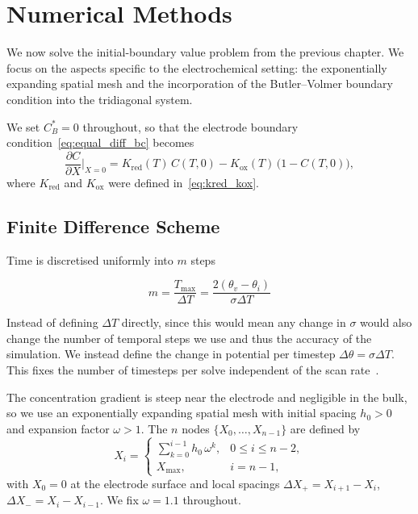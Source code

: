 \chapter{Numerical Methods}\label{ch:numerical-methods}

We now solve the initial-boundary value problem from the previous
chapter. We focus on the aspects specific to the electrochemical
setting: the exponentially expanding spatial mesh and the
incorporation of the Butler--Volmer boundary condition into the
tridiagonal system.

We set $C_B^* = 0$ throughout, so that the electrode boundary
condition~\cref{eq:equal_diff_bc} becomes
\begin{equation}
  \frac{\partial C}{\partial X}\bigg|_{X=0} =
  K_{\mathrm{red}}(T)\, C(T,0)
  - K_{\mathrm{ox}}(T)\, \big(1 - C(T,0)\big),
  \label{eq:num_bc}
\end{equation}
where $K_{\mathrm{red}}$ and $K_{\mathrm{ox}}$ were defined
in~\cref{eq:kred_kox}.

\section{Finite Difference Scheme}\label{sec:fd-scheme}

Time is discretised uniformly into $m$ steps

\begin{equation}
  m = \frac{T_{\mathrm{max}}}{\Delta T} = \frac{2(\theta_v -
  \theta_i)}{\sigma \Delta T}
  \label{eq:temporal_discritisation}
\end{equation}

Instead of defining $\Delta T$ directly, since this would mean any
change in $\sigma$ would also change the number of
temporal steps we use and thus the accuracy of the simulation. We instead
define the change in
potential per timestep $\Delta \theta = \sigma \Delta T$. This fixes
the number of timesteps per solve independent of the scan
rate~\cite{compton2014understanding}.

The concentration gradient is steep near the electrode and negligible in
the bulk, so we use an exponentially expanding spatial mesh with initial
spacing $h_0 > 0$ and expansion factor $\omega > 1$. The $n$ nodes
$\{X_0, \ldots, X_{n-1}\}$ are defined by
\begin{equation}
  X_i =
  \begin{cases}
    \displaystyle \sum_{k=0}^{i-1} h_0\,\omega^k, & 0 \leq i \leq n-2, \\[6pt]
    X_{\mathrm{max}},                               & i = n-1,
  \end{cases}
  \label{eq:spatial_grid}
\end{equation}
with $X_0 = 0$ at the electrode surface and local spacings $\Delta X_+ =
X_{i+1} - X_i$, $\Delta X_- = X_i - X_{i-1}$. We fix $\omega = 1.1$ throughout.


